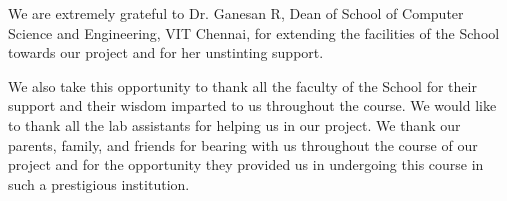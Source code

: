 \documentclass[conference]{IEEEtran}
\begin{document}
We are extremely grateful to Dr. Ganesan R, Dean of School of Computer 
Science and Engineering, VIT Chennai, for extending the facilities of the 
School towards our project and for her unstinting support. 

We also take this opportunity to thank all the faculty of the School for 
their support and their wisdom imparted to us throughout the course. We 
would like to thank all the lab assistants for helping us in our project. We thank our parents, family, and friends for bearing with us throughout the course of our project and for the opportunity they provided us in undergoing this course in such a prestigious institution.

    
    

    
\end{document}
